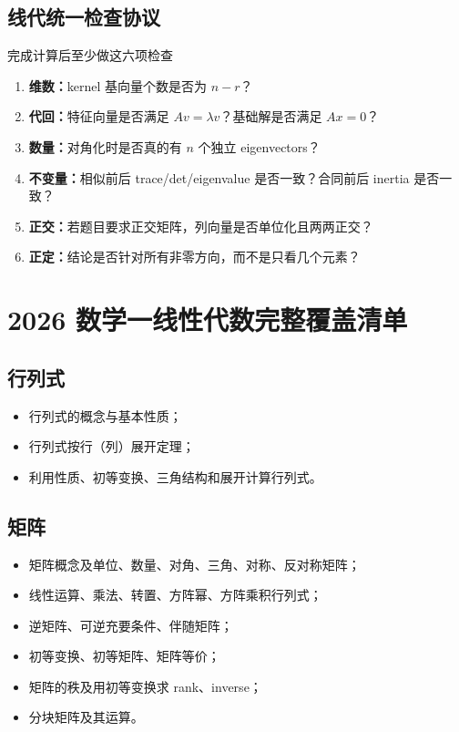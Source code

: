 \documentclass[11pt,a4paper,openany]{ctexbook}
\newcommand{\key}[1]{\textbf{\color{deep}#1}}
\begin{document}
\section{线代统一检查协议}
\begin{methodbox}{完成计算后至少做这六项检查}
\begin{enumerate}
  \item \key{维数：}kernel 基向量个数是否为 $n-r$？
  \item \key{代回：}特征向量是否满足 $Av=\lambda v$？基础解是否满足 $Ax=0$？
  \item \key{数量：}对角化时是否真的有 $n$ 个独立 eigenvectors？
  \item \key{不变量：}相似前后 trace/det/eigenvalue 是否一致？合同前后 inertia 是否一致？
  \item \key{正交：}若题目要求正交矩阵，列向量是否单位化且两两正交？
  \item \key{正定：}结论是否针对所有非零方向，而不是只看几个元素？
\end{enumerate}
\end{methodbox}

\appendix
\chapter{2026 数学一线性代数完整覆盖清单}

\section{行列式}
\begin{itemize}
  \item 行列式的概念与基本性质；
  \item 行列式按行（列）展开定理；
  \item 利用性质、初等变换、三角结构和展开计算行列式。
\end{itemize}

\section{矩阵}
\begin{itemize}
  \item 矩阵概念及单位、数量、对角、三角、对称、反对称矩阵；
  \item 线性运算、乘法、转置、方阵幂、方阵乘积行列式；
  \item 逆矩阵、可逆充要条件、伴随矩阵；
  \item 初等变换、初等矩阵、矩阵等价；
  \item 矩阵的秩及用初等变换求 rank、inverse；
  \item 分块矩阵及其运算。
\end{itemize}
\end{document}
